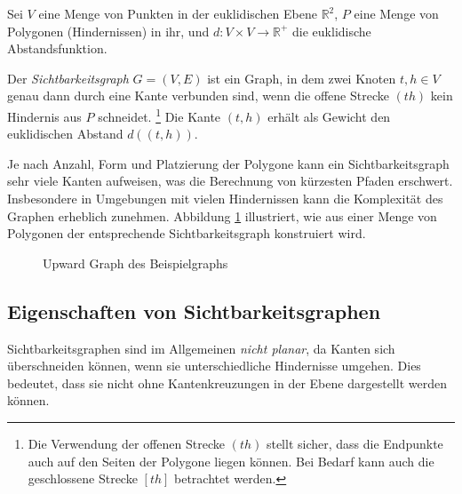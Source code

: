 \begin{definition}[Sichtbarkeitsgraph]
    Sei $V$ eine Menge von Punkten in der euklidischen Ebene $\mathbb{R}^2$, $P$ eine Menge von Polygonen (Hindernissen) in ihr, und $d \colon V \times V \to \mathbb{R}^+$ die euklidische Abstandsfunktion.

    Der \emph{Sichtbarkeitsgraph} $G = (V, E)$ ist ein Graph, in dem zwei Knoten $t, h \in V$ genau dann durch eine Kante verbunden sind, wenn die offene Strecke $(th)$ kein Hindernis aus $P$ schneidet.%
    \footnote{
        Die Verwendung der offenen Strecke $(th)$ stellt sicher, dass die Endpunkte auch auf den Seiten der Polygone liegen können.
        Bei Bedarf kann auch die geschlossene Strecke $[th]$ betrachtet werden.
    }
    Die Kante $(t, h)$ erhält als Gewicht den euklidischen Abstand $d((t, h))$.
\end{definition}

Je nach Anzahl, Form und Platzierung der Polygone kann ein Sichtbarkeitsgraph sehr viele Kanten aufweisen, was die Berechnung von kürzesten Pfaden erschwert.
Insbesondere in Umgebungen mit vielen Hindernissen kann die Komplexität des Graphen erheblich zunehmen.
Abbildung \ref{graph:fig:vis_example} illustriert, wie aus einer Menge von Polygonen der entsprechende Sichtbarkeitsgraph konstruiert wird.

\begin{figure}[ht]
    \centering
    \caption{Upward Graph des Beispielgraphs}
    \label{graph:fig:vis_example}
\end{figure}

\subsection{Eigenschaften von Sichtbarkeitsgraphen}

Sichtbarkeitsgraphen sind im Allgemeinen \emph{nicht planar}, da Kanten sich überschneiden können, wenn sie unterschiedliche Hindernisse umgehen.
Dies bedeutet, dass sie nicht ohne Kantenkreuzungen in der Ebene dargestellt werden können.

